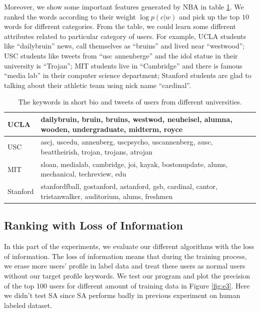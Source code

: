 \documentclass{article}
\begin{document}
Moreover, we show some important features generated by NBA in table \ref{tab:keyword}. We ranked the words according to their weight $\log p(c|w)$ and pick up the top $10$ words for different categories. From the table, we could learn some different attributes related to particular category of users. For example, UCLA students like ``dailybruin'' news, call themselves as ``bruins'' and lived near ``westwood''; USC students like tweets from ``usc annenberge'' and the idol statue in their university is ``Trojan''; MIT students live in ``Cambridge'' and there is famous ``media lab'' in their computer science department; Stanford students are glad to talking about their athletic team using nick name ``cardinal''.

\begin{table}[htb!]
\centering
\begin{tabular}{|l|l|}
\hline
UCLA & dailybruin, bruin, bruins, westwod, neuheisel, alumna, wooden, undergraduate, midterm, royce \\
\hline
USC & ascj, uscedu, annenberg, uscpsycho, uscannenberg, ausc, beattheirish, trojan, trojans, atrojan \\
\hline
MIT & sloan, medialab, cambridge, joi, kayak, bostonupdate, alums, mechanical, techreview, edu \\
\hline
Stanford & stanfordfball, gostanford, astanford, gsb, cardinal, cantor, tristanwalker, auditorium, alums, freshmen \\
\hline
\end{tabular}
\caption{The keywords in short bio and tweets of users from different universities.}\label{tab:keyword}
\end{table}

\subsection{Ranking with Loss of Information}
In this part of the experiments, we evaluate our different algorithms with the loss of information. The loss of information means that during the training process, we erase more users' profile in label data and treat these users as normal users without our target profile keywords. We test our program and plot the precision of the top 100 users for different amount of training data in Figure \ref{fig:e3}. Here we didn't test SA since SA performs badly in previous experiment on human labeled dataset.
\end{document}
